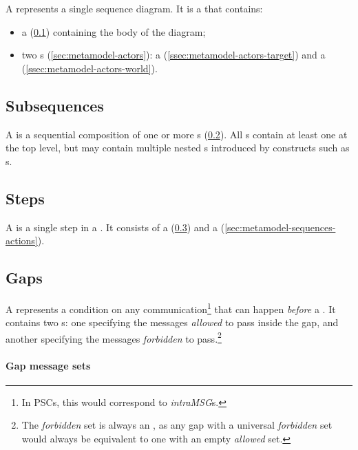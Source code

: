 A \msequence{} represents a single sequence diagram.  It is a \mnamedelement{}
that contains:

\begin{itemize}
\item
	a \msubsequence{} (\cref{ssec:metamodel-sequences-subsequences})
	containing the body of the diagram;
\item
	two \mactor s (\cref{sec:metamodel-actors}):
	a \mtargetactor{} (\cref{ssec:metamodel-actors-target})
	and a \mworld{} (\cref{ssec:metamodel-actors-world}).
\end{itemize}

\subsection{Subsequences}\label{ssec:metamodel-sequences-subsequences}

A \msubsequence{} is a sequential composition of one or more \msequencestep s
(\cref{ssec:metamodel-sequences-steps}).
All \msequence s contain at least one \msubsequence{} at the top level, but
may contain multiple nested \msubsequence s introduced by constructs such as
\mloopaction s.

\subsection{Steps}\label{ssec:metamodel-sequences-steps}

A \msequencestep{} is a single step in a \msubsequence.  It consists of a
\msequencegap{} (\cref{ssec:metamodel-sequences-gaps}) and a
\msequenceaction{} (\cref{sec:metamodel-sequences-actions}).

\subsection{Gaps}\label{ssec:metamodel-sequences-gaps}

A \msequencegap{} represents a condition on any communication\footnote{In PSCs,
this would correspond to \emph{intraMSG}s.} that can happen
\emph{before} a \msequenceaction.  
It contains two \mgapmessageset s: one specifying the messages
\emph{allowed} to pass inside the gap, and another specifying the messages
\emph{forbidden} to pass.\footnote{The \emph{forbidden} set is always an
\mextensionalgapmessageset, as any gap with a universal
\emph{forbidden} set would always be equivalent to one with an empty
\emph{allowed} set.
}

\paragraph{Gap message sets}

